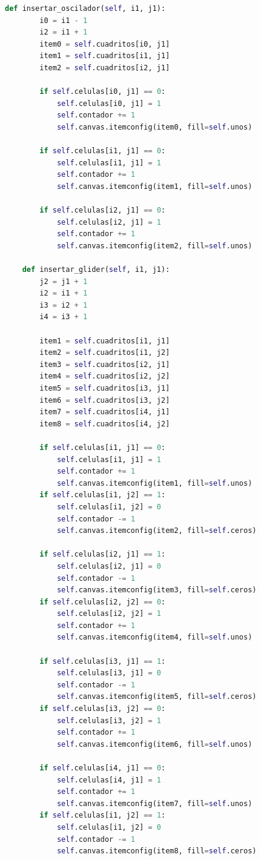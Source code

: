 \begin{lstlisting}[language=Python]
    def insertar_oscilador(self, i1, j1):
        i0 = i1 - 1
        i2 = i1 + 1
        item0 = self.cuadritos[i0, j1]
        item1 = self.cuadritos[i1, j1]
        item2 = self.cuadritos[i2, j1]

        if self.celulas[i0, j1] == 0:
            self.celulas[i0, j1] = 1
            self.contador += 1
            self.canvas.itemconfig(item0, fill=self.unos)

        if self.celulas[i1, j1] == 0:
            self.celulas[i1, j1] = 1
            self.contador += 1
            self.canvas.itemconfig(item1, fill=self.unos)

        if self.celulas[i2, j1] == 0:
            self.celulas[i2, j1] = 1
            self.contador += 1
            self.canvas.itemconfig(item2, fill=self.unos)

    def insertar_glider(self, i1, j1):
        j2 = j1 + 1
        i2 = i1 + 1
        i3 = i2 + 1
        i4 = i3 + 1

        item1 = self.cuadritos[i1, j1]
        item2 = self.cuadritos[i1, j2]
        item3 = self.cuadritos[i2, j1]
        item4 = self.cuadritos[i2, j2]
        item5 = self.cuadritos[i3, j1]
        item6 = self.cuadritos[i3, j2]
        item7 = self.cuadritos[i4, j1]
        item8 = self.cuadritos[i4, j2]

        if self.celulas[i1, j1] == 0:
            self.celulas[i1, j1] = 1
            self.contador += 1
            self.canvas.itemconfig(item1, fill=self.unos)
        if self.celulas[i1, j2] == 1:
            self.celulas[i1, j2] = 0
            self.contador -= 1
            self.canvas.itemconfig(item2, fill=self.ceros)

        if self.celulas[i2, j1] == 1:
            self.celulas[i2, j1] = 0
            self.contador -= 1
            self.canvas.itemconfig(item3, fill=self.ceros)
        if self.celulas[i2, j2] == 0:
            self.celulas[i2, j2] = 1
            self.contador += 1
            self.canvas.itemconfig(item4, fill=self.unos)

        if self.celulas[i3, j1] == 1:
            self.celulas[i3, j1] = 0
            self.contador -= 1
            self.canvas.itemconfig(item5, fill=self.ceros)
        if self.celulas[i3, j2] == 0:
            self.celulas[i3, j2] = 1
            self.contador += 1
            self.canvas.itemconfig(item6, fill=self.unos)

        if self.celulas[i4, j1] == 0:
            self.celulas[i4, j1] = 1
            self.contador += 1
            self.canvas.itemconfig(item7, fill=self.unos)
        if self.celulas[i1, j2] == 1:
            self.celulas[i1, j2] = 0
            self.contador -= 1
            self.canvas.itemconfig(item8, fill=self.ceros)


\end{lstlisting}
